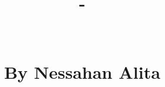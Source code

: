 \documentclass[a4paper, 12pt]{article}
\title{%
	\Large \textbf{\bookseries \space - \bookvolume} \\
	\hfill \break%
	\huge \textbf{\booktitle} \\
	\hfill \break%
	\large \textbf{\booksubtitle} \\
	\hfill \break%
	\hfill \break%
	\hfill \break%
	\small \textbf{By Nessahan Alita} \\
	\hfill \break%
	\hfill \break%
	\hfill \break%
	\citationdata \\
	\hfill \break%
	\keywords%
}
\date{}
\author{}
\begin{document}
\maketitle

\justifying



\normalsize
\tableofcontents



















\end{document}
